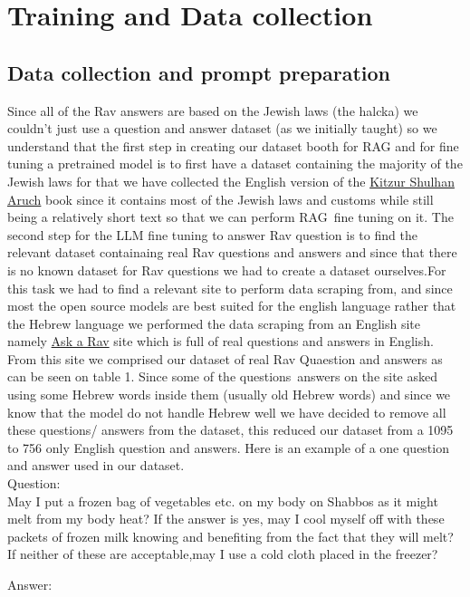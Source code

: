 \documentclass[11pt]{article}
\begin{document}
\section{Training and Data collection}
\subsection{Data collection and prompt preparation}
Since all of the Rav answers are based on the Jewish laws (the halcka) we couldn't just use a question and answer dataset (as we initially taught) so we understand that the first step in creating our dataset booth for RAG and for fine tuning a pretrained model is to  first have a dataset containing the majority of the Jewish laws for that we have collected the English version of the \href{https://en.wikipedia.org/wiki/Kitzur_Shulchan_Aruch}{ Kitzur Shulhan Aruch} book since it contains most of the Jewish laws and customs while still being a relatively short text so that we can perform RAG\ fine tuning on it.
The second step for the LLM fine tuning to answer Rav question is to find the relevant dataset containaing real Rav questions and answers  and since that there is no known dataset for Rav questions we had to create a dataset ourselves.For this task we had to find a relevant site to perform data scraping from, and since most the open source models are best suited for the english language rather that the Hebrew language we performed the data scraping from an English site namely \href{https://asktherav.com/ }{Ask a Rav} site which is full of real questions and answers in English. From this site we comprised our dataset of real Rav Quaestion and answers as can be seen on table 1.
Since some of the questions\ answers on the site asked using some Hebrew words inside them (usually old Hebrew words) and since we know that the model do not handle Hebrew well we have decided to remove all these questions/ answers from the dataset, this reduced our dataset from a 1095 to 756 only English question and answers.
Here is an example of a one question and answer used in our dataset.\\
Question:\\
 May I put a frozen bag of vegetables etc. on my body on Shabbos as it might melt from my body heat?
If the answer is yes, may I cool myself off with these packets of frozen milk knowing and benefiting from the fact that they will melt? If neither of these are acceptable,may I use a cold cloth placed in the freezer?

Answer:\\
\end{document}

